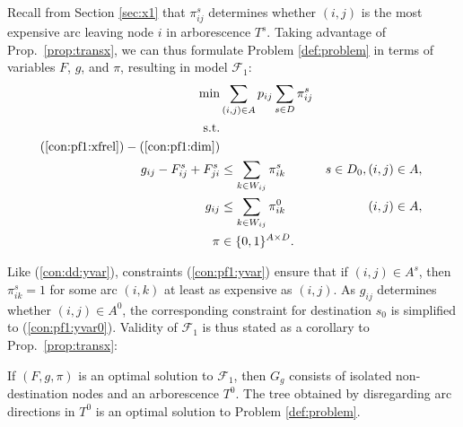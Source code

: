Recall from Section \ref{sec:x1} that $\pi_{ij}^s$ determines whether $(i,j)$ is the most expensive arc leaving node $i$ in arborescence $T^s$.
Taking advantage of Prop.\ \ref{prop:transx}, we can thus formulate Problem \ref{def:problem} in terms of variables $F$, $g$, and $\pi$,
resulting in model $\mathcal{F}_1$:
\begin{subequations}[resume]
\begin{align}
\notag\min & \sum\limits_{(i,j) \in A} p_{ij} \sum\limits_{s \in D} \pi^s_{ij}\\ 
\notag\text{s.t.} && \\
\notag(\ref{con:pf1:xfrel}) - (\ref{con:pf1:dim})\\
\label{con:pf1:yvar} g_{ij} - F^s_{ij}+F^s_{ji} & \leq \sum_{k\in W_{ij}}\pi^s_{ik}  & s\in D_0, (i,j)\in A,\\
\label{con:pf1:yvar0} g_{ij} & \leq \sum_{k\in W_{ij}}\pi^0_{ik}   &  (i,j)\in A,\\
\label{con:pf1:dimy} \pi&\in \{0,1\}^{A\times D}.
\end{align}~
\end{subequations}

Like (\ref{con:dd:yvar}), constraints (\ref{con:pf1:yvar}) ensure that if $(i,j)\in A^s$, then $\pi_{ik}^s=1$ for some
arc $(i,k)$ at least as expensive as $(i,j)$.
As $g_{ij}$ determines whether $(i,j)\in A^0$, the corresponding constraint for destination $s_0$ is simplified to (\ref{con:pf1:yvar0}).
Validity of $\mathcal{F}_1$ is thus stated as a corollary to Prop.\ \ref{prop:transx}:

\begin{cor}
If $(F,g,\pi)$ is an optimal solution to $\mathcal{F}_1$, then $G_g$ consists of isolated non-destination nodes and an arborescence $T^0$.
The tree obtained by disregarding arc directions in $T^0$ is an optimal solution to Problem \ref{def:problem}.
\end{cor}

